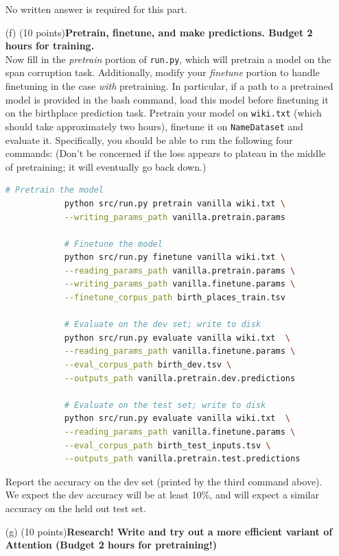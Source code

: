 \documentclass[letterpaper,12pt]{article}
\begin{document}
\begin{itemize}
		No written answer is required for this part.
		
	\item[(f)]
		(10 points)\textbf{Pretrain, finetune, and make predictions. Budget 2 hours for training.}\\
		Now fill in the \textit{pretrain} portion of \texttt{run.py}, which will pretrain a model on the span corruption task. Additionally, modify your \textit{finetune} portion to handle finetuning in the case \textit{with} pretraining. In particular, if a path to a pretrained model is provided in the bash command, load this model before finetuning it on the birthplace prediction task.
		Pretrain your model on \texttt{wiki.txt} (which should take approximately two hours), finetune it on \texttt{NameDataset} and evaluate it. Specifically, you should be able to run the following four commands:
		(Don't be concerned if the loss appears to plateau in the middle of pretraining; it will eventually go back down.)
		\begin{lstlisting}[language=bash]
			# Pretrain the model
			python src/run.py pretrain vanilla wiki.txt \
			--writing_params_path vanilla.pretrain.params
			
			# Finetune the model
			python src/run.py finetune vanilla wiki.txt \
			--reading_params_path vanilla.pretrain.params \
			--writing_params_path vanilla.finetune.params \
			--finetune_corpus_path birth_places_train.tsv
			
			# Evaluate on the dev set; write to disk
			python src/run.py evaluate vanilla wiki.txt  \
			--reading_params_path vanilla.finetune.params \
			--eval_corpus_path birth_dev.tsv \
			--outputs_path vanilla.pretrain.dev.predictions
			
			# Evaluate on the test set; write to disk
			python src/run.py evaluate vanilla wiki.txt  \
			--reading_params_path vanilla.finetune.params \
			--eval_corpus_path birth_test_inputs.tsv \
			--outputs_path vanilla.pretrain.test.predictions
		\end{lstlisting}
		
		Report the accuracy on the dev set (printed by the third command above). We expect the dev accuracy will be at least 10\%, and will expect a similar accuracy on the held out test set.
		
	\item[(g)]
		(10 points)\textbf{Research! Write and try out a more efficient variant of Attention (Budget 2 hours for pretraining!)}\\
		

\end{itemize}
\end{document}
